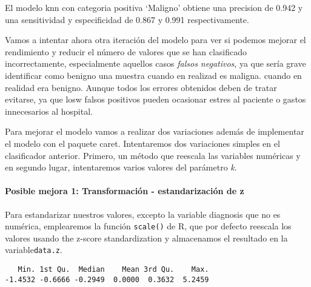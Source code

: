 \documentclass[
]{article}
\newenvironment{Shaded}{\begin{snugshade}}{\end{snugshade}}
\newcommand{\CommentTok}[1]{\textcolor[rgb]{0.56,0.35,0.01}{\textit{#1}}}
\newcommand{\DecValTok}[1]{\textcolor[rgb]{0.00,0.00,0.81}{#1}}
\newcommand{\KeywordTok}[1]{\textcolor[rgb]{0.13,0.29,0.53}{\textbf{#1}}}
\newcommand{\NormalTok}[1]{#1}
\newcommand{\OperatorTok}[1]{\textcolor[rgb]{0.81,0.36,0.00}{\textbf{#1}}}
\newcommand{\StringTok}[1]{\textcolor[rgb]{0.31,0.60,0.02}{#1}}
\let\oldparagraph\paragraph
\renewcommand{\paragraph}[1]{\oldparagraph{#1}\mbox{}}
\begin{document}
El modelo knn con categoria positiva `Maligno' obtiene una precision de
0.942 y una sensitividad y especificidad de 0.867 y 0.991
respectivamente.

Vamos a intentar ahora otra iteración del modelo para ver si podemos
mejorar el rendimiento y reducir el número de valores que se han
clasificado incorrectamente, especialmente aquellos casos \emph{falsos
negativos}, ya que sería grave identificar como benigno una muestra
cuando en realizad es maligna. cuando en realidad era benigno. Aunque
todos los errores obtenidos deben de tratar evitarse, ya que losw falsos
positivos pueden ocasionar estres al paciente o gastos innecesarios al
hospital.

Para mejorar el modelo vamos a realizar dos variaciones además de
implementar el modelo con el paquete caret. Intentaremos dos variaciones
simples en el clasificador anterior. Primero, un método que reescala las
variables numéricas y en segundo lugar, intentaremos varios valores del
parámetro \emph{k}.

\hypertarget{posible-mejora-1-transformaciuxf3n---estandarizaciuxf3n-de-z}{%
\paragraph{Posible mejora 1: Transformación - estandarización de
z}\label{posible-mejora-1-transformaciuxf3n---estandarizaciuxf3n-de-z}}

Para estandarizar nuestros valores, excepto la variable diagnosis que no
es numérica, emplearemos la función \texttt{scale()} de R, que por
defecto reescala los valores usando the z-score standardization y
almacenamos el resultado en la variable\texttt{data.z}.

\begin{Shaded}
\end{Shaded}

\begin{verbatim}
   Min. 1st Qu.  Median    Mean 3rd Qu.    Max. 
-1.4532 -0.6666 -0.2949  0.0000  0.3632  5.2459 
\end{verbatim}
\end{document}
